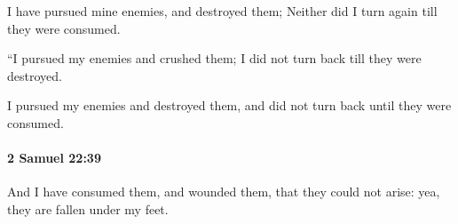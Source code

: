 			\begin{versebox}
					\item[BHS] 
					\item[ASV] I have pursued mine enemies, and destroyed them; Neither did I turn again till they were consumed.
					\item[NIV] “I pursued my enemies and crushed them; I did not turn back till they were destroyed.
					\item[NRSV] I pursued my enemies and destroyed them, and did not turn back until they were consumed.
			\end{versebox}

		\paragraph{2 Samuel 22:39} %
			\label{2SAMUEL-22-39}

			And I have consumed them, and wounded them, that they could not arise: yea, they are fallen under my feet.

